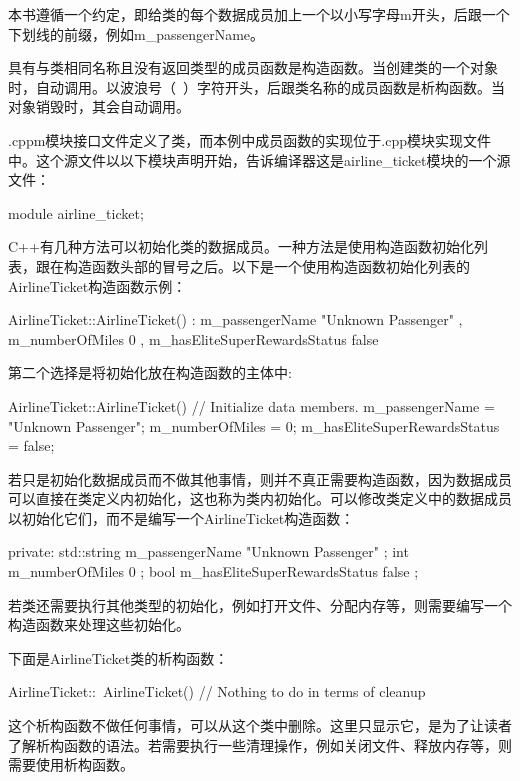 本书遵循一个约定，即给类的每个数据成员加上一个以小写字母m开头，后跟一个下划线的前缀，例如m\_passengerName。

具有与类相同名称且没有返回类型的成员函数是构造函数。当创建类的一个对象时，自动调用。以波浪号（~）字符开头，后跟类名称的成员函数是析构函数。当对象销毁时，其会自动调用。

.cppm模块接口文件定义了类，而本例中成员函数的实现位于.cpp模块实现文件中。这个源文件以以下模块声明开始，告诉编译器这是airline\_ticket模块的一个源文件：

\begin{cpp}
module airline_ticket;
\end{cpp}

C++有几种方法可以初始化类的数据成员。一种方法是使用构造函数初始化列表，跟在构造函数头部的冒号之后。以下是一个使用构造函数初始化列表的AirlineTicket构造函数示例：

\begin{cpp}
AirlineTicket::AirlineTicket()
    : m_passengerName { "Unknown Passenger" }
    , m_numberOfMiles { 0 }
    , m_hasEliteSuperRewardsStatus { false }
{}
\end{cpp}

第二个选择是将初始化放在构造函数的主体中:

\begin{cpp}
AirlineTicket::AirlineTicket()
{
    // Initialize data members.
    m_passengerName = "Unknown Passenger";
    m_numberOfMiles = 0;
    m_hasEliteSuperRewardsStatus = false;
}
\end{cpp}

若只是初始化数据成员而不做其他事情，则并不真正需要构造函数，因为数据成员可以直接在类定义内初始化，这也称为类内初始化。可以修改类定义中的数据成员以初始化它们，而不是编写一个AirlineTicket构造函数：

\begin{cpp}
private:
    std::string m_passengerName { "Unknown Passenger" };
    int m_numberOfMiles { 0 };
    bool m_hasEliteSuperRewardsStatus { false };
\end{cpp}

若类还需要执行其他类型的初始化，例如打开文件、分配内存等，则需要编写一个构造函数来处理这些初始化。

下面是AirlineTicket类的析构函数：

\begin{cpp}
AirlineTicket::~AirlineTicket()
{
    // Nothing to do in terms of cleanup
}
\end{cpp}

这个析构函数不做任何事情，可以从这个类中删除。这里只显示它，是为了让读者了解析构函数的语法。若需要执行一些清理操作，例如关闭文件、释放内存等，则需要使用析构函数。

